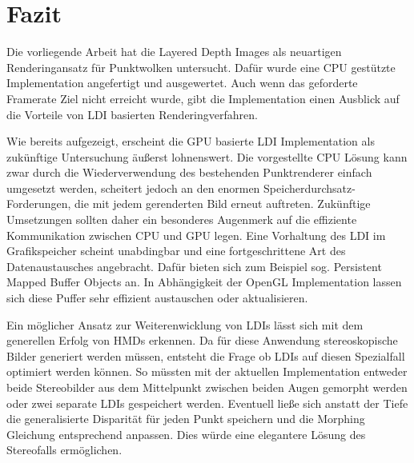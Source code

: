 \documentclass[hyperref, beleg, german]{cgvpub}
\begin{document}
\chapter{Fazit}

Die vorliegende Arbeit hat die Layered Depth Images als neuartigen
Renderingansatz für Punktwolken untersucht. Dafür wurde eine CPU gestützte
Implementation angefertigt und ausgewertet. Auch wenn das geforderte Framerate
Ziel nicht erreicht wurde, gibt die Implementation einen Ausblick auf die
Vorteile von LDI basierten Renderingverfahren.

Wie bereits aufgezeigt, erscheint die GPU basierte LDI Implementation als
zukünftige Untersuchung äußerst lohnenswert. Die vorgestellte CPU Lösung kann
zwar durch die Wiederverwendung des bestehenden Punktrenderer einfach umgesetzt
werden, scheitert jedoch an den enormen Speicherdurchsatz-Forderungen, die mit
jedem gerenderten Bild erneut auftreten. Zukünftige Umsetzungen sollten daher
ein besonderes Augenmerk auf die effiziente Kommunikation zwischen CPU und GPU
legen. Eine Vorhaltung des LDI im Grafikspeicher scheint unabdingbar und eine
fortgeschrittene Art des Datenaustausches angebracht. Dafür bieten sich zum
Beispiel sog. Persistent Mapped Buffer Objects an. In Abhängigkeit der OpenGL
Implementation lassen sich diese Puffer sehr effizient austauschen oder
aktualisieren.

Ein möglicher Ansatz zur Weiterenwicklung von LDIs lässt sich mit dem
generellen Erfolg von HMDs erkennen. Da für diese Anwendung stereoskopische
Bilder generiert werden müssen, entsteht die Frage ob LDIs auf diesen
Spezialfall optimiert werden können. So müssten mit der aktuellen
Implementation entweder beide Stereobilder aus dem Mittelpunkt zwischen beiden
Augen gemorpht werden oder zwei separate LDIs gespeichert werden. Eventuell
ließe sich anstatt der Tiefe die generalisierte Disparität für jeden Punkt
speichern und die Morphing Gleichung entsprechend anpassen. Dies würde eine
elegantere Lösung des Stereofalls ermöglichen.
\end{document}
